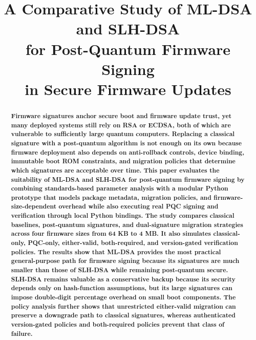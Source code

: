 \documentclass[conference]{IEEEtran}
\begin{document}

\title{A Comparative Study of ML-DSA and SLH-DSA\\
for Post-Quantum Firmware Signing\\
in Secure Firmware Updates}

\author{
}

\maketitle
\thispagestyle{empty}
\vspace{0.5em}

\begin{abstract}
\textbf{Firmware signatures anchor secure boot and firmware update trust, yet many deployed systems still rely on RSA or ECDSA, both of which are vulnerable to sufficiently large quantum computers. Replacing a classical signature with a post-quantum algorithm is not enough on its own because firmware deployment also depends on anti-rollback controls, device binding, immutable boot ROM constraints, and migration policies that determine which signatures are acceptable over time. This paper evaluates the suitability of ML-DSA and SLH-DSA for post-quantum firmware signing by combining standards-based parameter analysis with a modular Python prototype that models package metadata, migration policies, and firmware-size-dependent overhead while also executing real PQC signing and verification through local Python bindings. The study compares classical baselines, post-quantum signatures, and dual-signature migration strategies across four firmware sizes from 64 KB to 4 MB. It also simulates classical-only, PQC-only, either-valid, both-required, and version-gated verification policies. The results show that ML-DSA provides the most practical general-purpose path for firmware signing because its signatures are much smaller than those of SLH-DSA while remaining post-quantum secure. SLH-DSA remains valuable as a conservative backup because its security depends only on hash-function assumptions, but its large signatures can impose double-digit percentage overhead on small boot components. The policy analysis further shows that unrestricted either-valid migration can preserve a downgrade path to classical signatures, whereas authenticated version-gated policies and both-required policies prevent that class of failure.}
\end{abstract}
\end{document}
